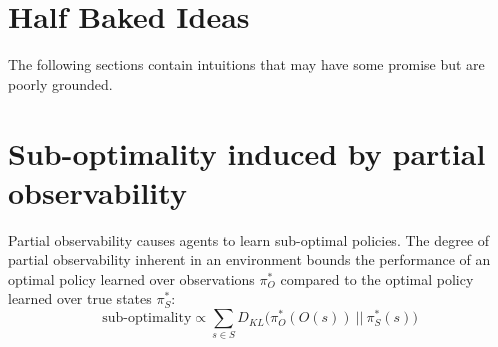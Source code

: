 \documentclass{article} %
\theoremstyle{definition}
\begin{document}
\section{Half Baked Ideas}
The following sections contain intuitions that may have some promise
but are poorly grounded.

\section{Sub-optimality induced by partial observability}
Partial observability causes agents to learn sub-optimal policies. The
degree of partial observability inherent in an environment bounds the
performance of an optimal policy learned over observations $\pi_O^*$
compared to the optimal policy learned over true states $\pi_S^*$:
\[
\textrm{sub-optimality} \propto \sum_{s\in S} D_{KL}\big(\pi_O^*(O(s))\ ||\ \pi_S^*(s)\big)
\]



\end{document}
